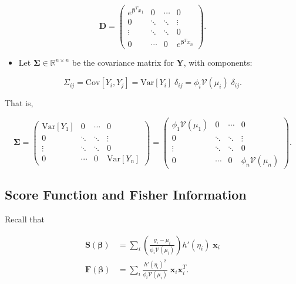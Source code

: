 \documentclass[
  12pt,
]{book}
\providecommand{\tightlist}{%
  \setlength{\itemsep}{0pt}\setlength{\parskip}{0pt}}
\begin{document}
\begin{equation}
  \boldsymbol{D} =
    \begin{pmatrix}
      e^{\boldsymbol{\beta}^{T}x_{1}} & 0 & \cdots & 0 \\
      0 & \ddots & \ddots & \vdots \\
      \vdots & \ddots & \ddots & 0 \\
      0 & \cdots & 0 & e^{\boldsymbol{\beta}^{T}x_{n}}
    \end{pmatrix}.
\end{equation}

\begin{itemize}
\tightlist
\item
  Let \(\boldsymbol{\Sigma}\in{\mathbb R}^{n\times n}\) be the covariance matrix for \(\boldsymbol{Y}\), with components:
\end{itemize}

\begin{equation}
  \Sigma_{ij} 
  = \text{Cov}[Y_{i}, Y_{j}]
  = \text{Var}[Y_{i}]\;\delta_{ij}
  = \phi_{i}\mathcal{V}(\mu_{i})\;\delta_{ij}.
\end{equation}

That is,

\begin{equation}
  \boldsymbol{\Sigma} =
    \begin{pmatrix}
      \text{Var}[Y_{1}] & 0 & \cdots & 0 \\
      0 & \ddots & \ddots & \vdots \\
      \vdots & \ddots & \ddots & 0 \\
      0 & \cdots & 0 & \text{Var}[Y_{n}]
    \end{pmatrix}
  = \begin{pmatrix}
      \phi_{1}\mathcal{V}(\mu_{1}) & 0 & \cdots & 0 \\
      0 & \ddots & \ddots & \vdots \\
      \vdots & \ddots & \ddots & 0 \\
      0 & \cdots & 0 & \phi_{n}\mathcal{V}(\mu_{n})
    \end{pmatrix}.
\end{equation}

\subsection{Score Function and Fisher Information}\label{matrixform}

Recall that

\begin{align}
  \boldsymbol{S}(\boldsymbol{\beta})
  & = \sum_{i} \left( \frac{y_{i} - \mu_{i}}{ \phi_{i}\mathcal{V}(\mu_{i})} \right) h'(\eta_{i}) \;\boldsymbol{x}_{i} \\
  \boldsymbol{F}(\boldsymbol{\beta})
  & = \sum_{i} \frac{h'(\eta_{i})^{2}}{ \phi_{i}\mathcal{V}(\mu_{i})} \;\boldsymbol{x}_{i} \boldsymbol{x}_{i}^{T}.
\end{align}
\end{document}
